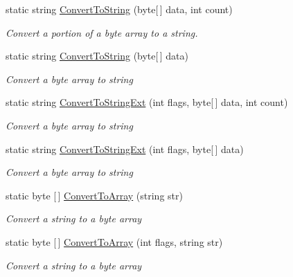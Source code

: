 \begin{DoxyCompactItemize}
static string \hyperlink{class_i_c_sharp_code_1_1_sharp_zip_lib_1_1_zip_1_1_zip_constants_ae68d920017541e00bf7ef9a04ae70ad6}{Convert\+To\+String} (byte\mbox{[}$\,$\mbox{]} data, int count)
\begin{DoxyCompactList}\small\item\em Convert a portion of a byte array to a string. \end{DoxyCompactList}\item 
static string \hyperlink{class_i_c_sharp_code_1_1_sharp_zip_lib_1_1_zip_1_1_zip_constants_a992591a74674d7c5c0f40f7131828377}{Convert\+To\+String} (byte\mbox{[}$\,$\mbox{]} data)
\begin{DoxyCompactList}\small\item\em Convert a byte array to string \end{DoxyCompactList}\item 
static string \hyperlink{class_i_c_sharp_code_1_1_sharp_zip_lib_1_1_zip_1_1_zip_constants_a8c21dda28bd9df475755e3e534eb33cf}{Convert\+To\+String\+Ext} (int flags, byte\mbox{[}$\,$\mbox{]} data, int count)
\begin{DoxyCompactList}\small\item\em Convert a byte array to string \end{DoxyCompactList}\item 
static string \hyperlink{class_i_c_sharp_code_1_1_sharp_zip_lib_1_1_zip_1_1_zip_constants_acc1adc9b5927c38c8eb9d98aaab058ea}{Convert\+To\+String\+Ext} (int flags, byte\mbox{[}$\,$\mbox{]} data)
\begin{DoxyCompactList}\small\item\em Convert a byte array to string \end{DoxyCompactList}\item 
static byte \mbox{[}$\,$\mbox{]} \hyperlink{class_i_c_sharp_code_1_1_sharp_zip_lib_1_1_zip_1_1_zip_constants_a01022ba5b96baff1480a068a3368d9ea}{Convert\+To\+Array} (string str)
\begin{DoxyCompactList}\small\item\em Convert a string to a byte array \end{DoxyCompactList}\item 
static byte \mbox{[}$\,$\mbox{]} \hyperlink{class_i_c_sharp_code_1_1_sharp_zip_lib_1_1_zip_1_1_zip_constants_aabd972cf063c86c2ef2b9fd32ba393c7}{Convert\+To\+Array} (int flags, string str)
\begin{DoxyCompactList}\small\item\em Convert a string to a byte array \end{DoxyCompactList}\end{DoxyCompactItemize}
